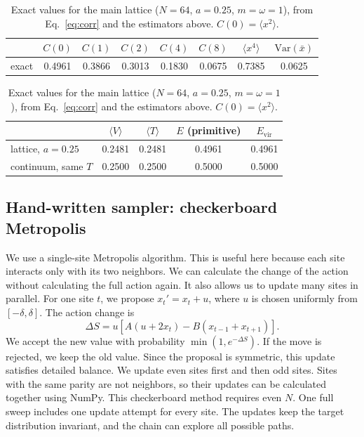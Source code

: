 \documentclass[11pt]{article}
\begin{document}
\begin{table}[htbp]
\centering
\small
\begin{tabular}{lccccccc}
\toprule
 & $C(0)$ & $C(1)$ & $C(2)$ & $C(4)$ & $C(8)$ & $\langle x^4\rangle$
 & $\mathrm{Var}(\bar{x})$\\
\midrule
exact & 0.4961 & 0.3866 & 0.3013 & 0.1830 & 0.0675 & 0.7385 & 0.0625\\
\bottomrule
\end{tabular}

\medskip
\begin{tabular}{lcccc}
\toprule
 & $\langle V\rangle$ & $\langle T\rangle$ & $E$ (primitive) & $E_{\mathrm{vir}}$\\
\midrule
lattice, $a = 0.25$ & 0.2481 & 0.2481 & 0.4961 & 0.4961\\
continuum, same $T$ & 0.2500 & 0.2500 & 0.5000 & 0.5000\\
\bottomrule
\end{tabular}
\caption{Exact values for the main lattice ($N = 64$, $a = 0.25$,
$m = \omega = 1$), from Eq.~\eqref{eq:corr} and the estimators above.
$C(0) = \langle x^2\rangle$.}
\label{tab:exact}
\end{table}

\subsection{Hand-written sampler: checkerboard Metropolis}

We use a single-site Metropolis algorithm. This is useful here because each
site interacts only with its two neighbors. We can calculate the change of the
action without calculating the full action again. It also allows us to update
many sites in parallel. For one site $t$, we propose $x_t' = x_t + u$, where
$u$ is chosen uniformly from $[-\delta, \delta]$. The action change is
\begin{equation}
  \Delta S = u\left[A(u + 2x_t) - B(x_{t-1} + x_{t+1})\right].
  \label{eq:dS}
\end{equation}
We accept the new value with probability $\min(1, e^{-\Delta S})$. If the move
is rejected, we keep the old value. Since the proposal is symmetric, this update
satisfies detailed balance. We update even sites first and then odd sites.
Sites with the same parity are not neighbors, so their updates can be
calculated together using NumPy. This checkerboard method requires even $N$.
One full sweep includes one update attempt for every site. The updates keep the
target distribution invariant, and the chain can explore all possible paths.
\end{document}

